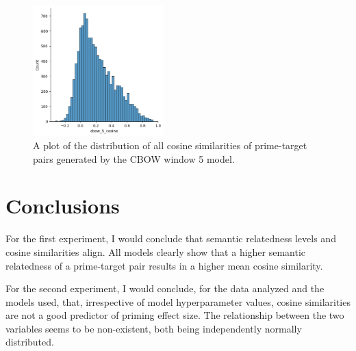 \documentclass{IEEEtran}
\begin{document}
\begin{figure}
    \centering
    \includegraphics[width=0.45\textwidth]{images/distribution_cbow_5_cosine.png}
    \caption{A plot of the distribution of all cosine similarities of prime-target pairs generated by the CBOW window 5 model.}
    \label{fig:cosine_cbow_5_distribution}
\end{figure}

\section{Conclusions}
For the first experiment, I would conclude that semantic relatedness levels and cosine similarities align.
All models clearly show that a higher semantic relatedness of a prime-target pair results in a higher mean cosine similarity.

For the second experiment, I would conclude, for the data analyzed and the models used, that, irrespective of model hyperparameter values, cosine similarities are not a good predictor of priming effect size.
The relationship between the two variables seems to be non-existent, both being independently normally distributed.
\end{document}
